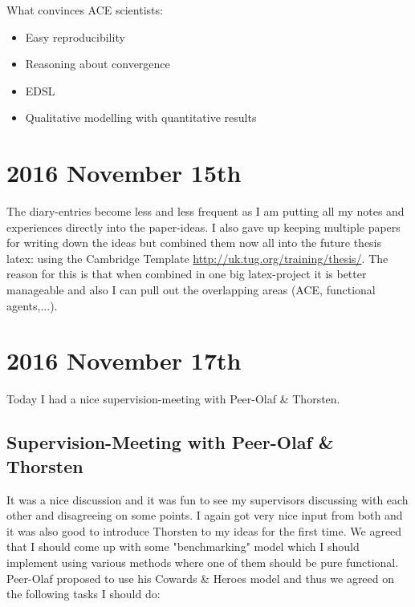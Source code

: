 What convinces ACE scientists:
\begin{itemize}
\item Easy reproducibility
\item Reasoning about convergence
\item EDSL
\item Qualitative modelling with quantitative results
\end{itemize}

\section*{2016 November 15th}
The diary-entries become less and less frequent as I am putting all my notes and experiences directly into the paper-ideas. I also gave up keeping multiple papers for writing down the ideas but combined them now all into the future thesis latex: using the Cambridge Template \url{http://uk.tug.org/training/thesis/}. The reason for this is that when combined in one big latex-project it is better manageable and also I can pull out the overlapping areas (ACE, functional agents,...).

\section*{2016 November 17th}
Today I had a nice supervision-meeting with Peer-Olaf \& Thorsten.

\subsection*{Supervision-Meeting with Peer-Olaf \& Thorsten}
It was a nice discussion and it was fun to see my supervisors discussing with each other and disagreeing on some points. I again got very nice input from both and it was also good to introduce Thorsten to my ideas for the first time. We agreed that I should come up with some "benchmarking" model which I should implement using various methods where one of them should be pure functional. Peer-Olaf proposed to use his Cowards \& Heroes model and thus we agreed on the following tasks I should do:

